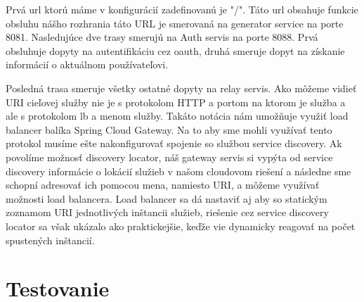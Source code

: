 Prvá \acrshort{url} ktorú máme v konfigurácií zadefinovanú je "/". Táto \acrshort{url} obsahuje funkcie obsluhu nášho rozhrania táto URL je smerovaná na generator service na porte 8081. 
Nasledujúce dve trasy smerujú na Auth servis na porte 8088. Prvá obsluhuje dopyty na autentifikáciu cez \acrshort{oauth}, druhá smeruje dopyt na získanie informácií o aktuálnom používateľovi. 

Posledná trasa smeruje všetky ostatné dopyty na relay servis. Ako môžeme vidieť URI cieľovej služby nie je s protokolom HTTP a portom na ktorom je služba a ale s protokolom lb a menom služby. Takáto notácia nám umožňuje využiť load balancer balíka Spring Cloud Gateway. Na to aby sme mohli využívať tento protokol musíme ešte nakonfigurovať spojenie so službou service discovery. Ak povolíme možnosť discovery locator, náš gateway servis si vypýta od service discovery informácie o lokácií služieb v našom cloudovom riešení a následne sme schopní adresovať ich pomocou mena, namiesto URI, a môžeme využívať možnosti load balancera. Load balancer sa dá nastaviť aj aby so statickým zoznamom URI jednotlivých inštancii služieb, riešenie cez service discovery locator sa však ukázalo ako praktickejšie, keďže vie dynamicky reagovať na počet spustených inštancií.   


\section{Testovanie} 
 




